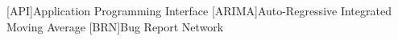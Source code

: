 
\begin{acronym}[align=right]
[API]{Application Programming Interface}
[ARIMA]{Auto-Regressive Integrated Moving Average}
[BRN]{Bug Report Network}


\end{acronym}




%

